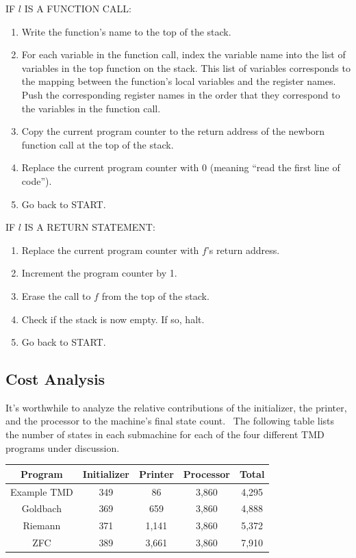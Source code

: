 \documentclass[11pt]{article}
\newcommand{\statenum}{7,910 }
\newcommand{\gbstatenum}{4,888 }
\newcommand{\rmstatenum}{5,372 }
\begin{document}
\noindent IF $l$ IS A FUNCTION CALL:
\begin{enumerate}
\item Write the function's name to the top of the stack.
\item For each variable in the function call, index the variable name into the list of variables in the top function on the stack. This list of variables corresponds to the mapping between the function's local variables and the register names. Push the corresponding register names in the order that they correspond to the variables in the function call.
\item Copy the current program counter to the return address of the newborn function call at the top of the stack.
\item Replace the current program counter with 0 (meaning ``read the first line of code'').
\item Go back to START.
\end{enumerate}

\noindent IF $l$ IS A RETURN STATEMENT:
\begin{enumerate}
\item Replace the current program counter with $f$'s return address.
\item Increment the program counter by 1.
\item Erase the call to $f$ from the top of the stack.
\item Check if the stack is now empty. If so, halt.
\item Go back to START.
\end{enumerate}

\subsection{Cost Analysis} \label{sec:cost}

It's worthwhile to analyze the relative contributions of the initializer, the printer, and the processor to the machine's final state count. \ The following table lists the number of states in each submachine for each of the four different TMD programs under discussion.

\begin{center}
    \begin{tabular}{||c c c c c||}
    \hline
    Program & Initializer & Printer & Processor & Total \\ [0.5ex]
    \hline\hline
    Example TMD & 349 & 86 & 3,860 & 4,295 \\
    \hline
    Goldbach & 369 & 659 & 3,860 & \gbstatenum \\
    \hline
    Riemann & 371 & 1,141 & 3,860 & \rmstatenum \\
    \hline
    ZFC & 389 & 3,661 & 3,860 & \statenum \\
    \hline
    \end{tabular}
\end{center}
\end{document}
